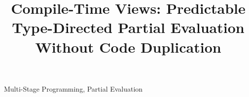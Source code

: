 \documentclass[10pt,preprint]{sigplanconf}
\begin{document}
\title{Compile-Time Views: Predictable Type-Directed Partial Evaluation Without Code Duplication}

\authorinfo{}
           {}
           {}
\authorinfo{}
           {}
           {}
\authorinfo{}
           {}
           {}
\authorinfo{}
           {}
           {}

\maketitle

\begin{abstract}

\end{abstract}

\keywords
Multi-Stage Programming, Partial Evaluation













\end{document}

